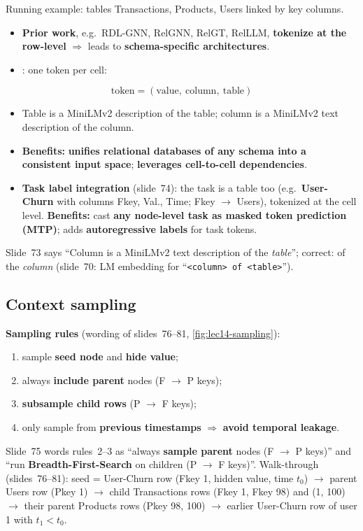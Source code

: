 Running example: tables Transactions, Products, Users linked by key columns.
\begin{itemize}
  \item \textbf{Prior work}, e.g.\ RDL-GNN, RelGNN, RelGT, RelLLM, \textbf{tokenize at the
    row-level} $\Rightarrow$ leads to \textbf{schema-specific architectures}.
  \item {}: one token per cell:
\end{itemize}
\begin{equation}\label{eq:lec14-token}
  \text{token} = (\text{value},\ \text{column},\ \text{table})
\end{equation}
\begin{itemize}
  \item Table is a MiniLMv2 description of the table; column is a MiniLMv2 text
    description of the column.
  \item \textbf{Benefits:} \textbf{unifies relational databases of any schema into a
    consistent input space}; \textbf{leverages cell-to-cell dependencies}.
  \item \textbf{Task label integration} (slide~74): the task is a table too (e.g.\
    \textbf{User-Churn} with columns Fkey, Val., Time; Fkey $\to$ Users), tokenized at the
    cell level. \textbf{Benefits:} cast \textbf{any node-level task as masked token
    prediction (MTP)}; adds \textbf{autoregressive labels} for task tokens.
\end{itemize}
\begin{caution}
  Slide~73 says ``Column is a MiniLMv2 text description of the \emph{table}''; correct: of the
  \emph{column} (slide~70: LM embedding for ``\texttt{<column> of <table>}'').
\end{caution}

\subsection{Context sampling}\label{sec:lec14-sampling}

\textbf{Sampling rules} (wording of slides~76--81, \cref{fig:lec14-sampling}):
\begin{enumerate}
  \item sample \textbf{seed node} and \textbf{hide value};
  \item always \textbf{include parent} nodes (F $\to$ P keys);
  \item \textbf{subsample child rows} (P $\to$ F keys);
  \item only sample from \textbf{previous timestamps} $\Rightarrow$ \textbf{avoid temporal
    leakage}.
\end{enumerate}
Slide~75 words rules~2--3 as ``always \textbf{sample parent} nodes (F $\to$ P keys)'' and
``run \textbf{Breadth-First-Search} on children (P $\to$ F keys)''.
Walk-through (slides~76--81): seed = User-Churn row (Fkey 1, hidden value, time $t_0$)
$\to$ parent Users row (Pkey 1) $\to$ child Transactions rows (Fkey 1, Fkey 98) and (1,
100) $\to$ their parent Products rows (Pkey 98, 100) $\to$ earlier User-Churn row of user 1
with $t_1<t_0$.

